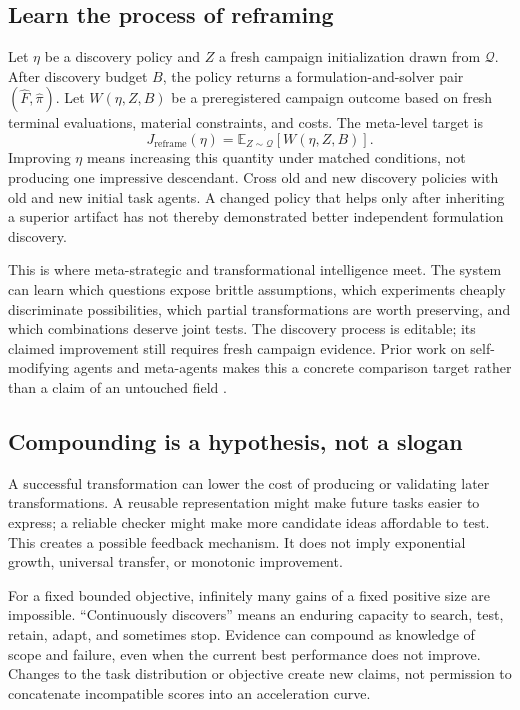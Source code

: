 \documentclass[11pt,letterpaper]{article}
\newcommand{\E}{\mathbb E}
\theoremstyle{remark}\newtheorem{remark}{Remark}[section]
\begin{document}
\subsection{Learn the process of reframing}
Let $\eta$ be a discovery policy and $Z$ a fresh campaign initialization drawn from $\mathcal Q$. After discovery budget $B$, the policy returns a formulation-and-solver pair $(\widehat F,\widehat\pi)$. Let $W(\eta,Z,B)$ be a preregistered campaign outcome based on fresh terminal evaluations, material constraints, and costs. The meta-level target is
\begin{equation}
J_{\mathrm{reframe}}(\eta)=\E_{Z\sim\mathcal Q}[W(\eta,Z,B)].\label{eq:meta}
\end{equation}
Improving $\eta$ means increasing this quantity under matched conditions, not producing one impressive descendant. Cross old and new discovery policies with old and new initial task agents. A changed policy that helps only after inheriting a superior artifact has not thereby demonstrated better independent formulation discovery.

This is where meta-strategic and transformational intelligence meet. The system can learn which questions expose brittle assumptions, which experiments cheaply discriminate possibilities, which partial transformations are worth preserving, and which combinations deserve joint tests. The discovery process is editable; its claimed improvement still requires fresh campaign evidence. Prior work on self-modifying agents and meta-agents makes this a concrete comparison target rather than a claim of an untouched field \citep{zhang2025dgm,zhang2026hyperagents}.

\subsection{Compounding is a hypothesis, not a slogan}
A successful transformation can lower the cost of producing or validating later transformations. A reusable representation might make future tasks easier to express; a reliable checker might make more candidate ideas affordable to test. This creates a possible feedback mechanism. It does not imply exponential growth, universal transfer, or monotonic improvement.

For a fixed bounded objective, infinitely many gains of a fixed positive size are impossible. ``Continuously discovers'' means an enduring capacity to search, test, retain, adapt, and sometimes stop. Evidence can compound as knowledge of scope and failure, even when the current best performance does not improve. Changes to the task distribution or objective create new claims, not permission to concatenate incompatible scores into an acceleration curve.
\end{document}
